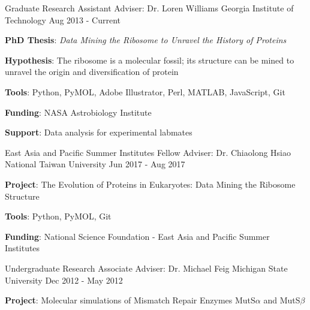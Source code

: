 

\begin{cventries}

  \cventry
    {Graduate Research Assistant} %
    {Adviser: Dr. Loren Williams} %
    {Georgia Institute of Technology} %
    {Aug 2013 - Current} %
    {{\textbf{PhD Thesis}: \textit{Data Mining the Ribosome to Unravel the History of Proteins}}
      \begin{cvitems} %
      \vspace{4.0mm}
        \item {\textbf{Hypothesis}: The ribosome is a molecular fossil; its structure can be mined to unravel the origin and diversification of protein}
        \item {\textbf{Tools}: Python, PyMOL, Adobe Illustrator, Perl, MATLAB, JavaScript, Git}
        \item {\textbf{Funding}: NASA Astrobiology Institute}
        \item {\textbf{Support}: Data analysis for experimental labmates}
      \end{cvitems}
    }
    
  \cventry
    {East Asia and Pacific Summer Institutes Fellow} %
    {Adviser: Dr. Chiaolong Hsiao} %
    {National Taiwan University} %
    {Jun 2017 - Aug 2017} %
    {
      \begin{cvitems} %
      	\item {\textbf{Project}: The Evolution of Proteins in Eukaryotes: Data Mining the Ribosome Structure}
        \item {\textbf{Tools}: Python, PyMOL, Git}
        \item {\textbf{Funding}: National Science Foundation - East Asia and Pacific Summer Institutes}
      \end{cvitems}
    }
    
  \cventry
    {Undergraduate Research Associate} %
    {Adviser: Dr. Michael Feig} %
    {Michigan State University} %
    {Dec 2012 - May 2012} %
    {
      \begin{cvitems} %
        \item {\textbf{Project}: Molecular simulations of Mismatch Repair Enzymes MutS$\alpha$ and MutS$\beta$}
      \end{cvitems}
    }


\end{cventries}
